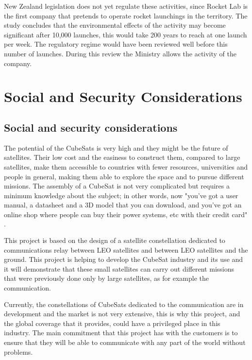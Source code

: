 New Zealand legislation does not yet regulate these activities, since Rocket Lab is the first company that pretends to operate rocket launchings in the territory. The study concludes that the environmental effects of the activity may become significant after 10,000 launches, this would take 200 years to reach at one launch per week. The regulatory regime would have been reviewed well before this number of launches. During this review the Ministry allows the activity of the company.

\chapter{Social and Security Considerations}

\section{Social and security considerations}

The potential of the CubeSats is very high and they might be the future of satellites. Their low cost and the easiness to construct them, compared to large satellites, make them accessible to countries with fewer resources, universities and people in general, making them able to explore the space and to pursue different missions. The assembly of a CubeSat is not very complicated but requires a minimum knowledge about the subject; in other words, now "you've got a user manual, a datasheet and a 3D model that you can download, and you've got an online shop where people can buy their power systems, etc with their credit card" \cite{CraigClark}. 

This project is based on the design of a satellite constellation dedicated to communications relay between LEO satellites and between LEO satellites and the ground. This project is helping to develop the CubeSat industry and its use and it will demonstrate that these small satellites can carry out different missions that were previously done only by large satellites, as for example the communication.

Currently, the constellations of CubeSats dedicated to the communication are in development and the market is not very extensive, this is why this project, and the global coverage that it provides, could have a privileged place in this industry. The main commitment that this project has with the customers is to ensure that they will be able to communicate with any part of the world without problems. 

